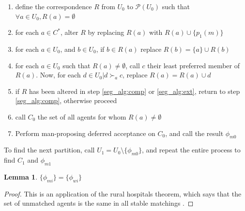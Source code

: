 \documentclass[WP]{AEA}
\newtheorem{lemma}{Lemma}
\begin{document}
\begin{enumerate}
	\item define the correspondence $R$ from $U_0$ to $\mathcal{P}(U_0)$ such that $\forall a \in U_0, R(a) = \emptyset$
	\item for each $a \in C^*$, alter $R$ by replacing $R(a)$ with  $R(a) \cup \{p_1(m)\}$
	\item  \label{seg_alg:comp} for each $a \in U_0$, and $b \in U_0$, if $ b \in R(a)$ replace $R(b) = \{a\} \cup R(b)$
	\item  \label{seg_alg:ext} for each $a \in U_0$ such that $R(a) \neq \emptyset$, call  $c$ their least preferred member of $R(a)$. Now, for each $d \in U_0 | d \succ_a c$, replace $R(a) = R(a) \cup d$ 
	\item if $R$ has been altered in step \ref*{seg_alg:comp} or \ref*{seg_alg:ext}, return to step \ref*{seg_alg:comp}, otherwise proceed
	\item call $C_0$ the set of all agents for whom $R(a) \neq \emptyset$
	\item Perform man-proposing deferred acceptance on $C_0$, and call the result $\phi_{m0}$
\end{enumerate}

To find the next partition, call $U_1 = U_0 \setminus \{\phi_{m0}\}$, and repeat the entire process to find $C_1$ and $\phi_{m1}$

\begin{lemma}
	$\{\phi_{mi}\}=\{\phi_{wi}\}$
\end{lemma}
\begin{proof}
	This is an application of the rural hospitals theorem, which says that the set of unmatched agents is the same in all stable matchings \cite{Roth1986}.
\end{proof}
\end{document}
